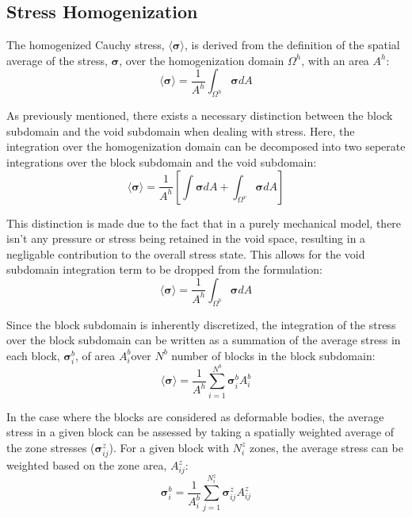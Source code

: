 \subsection{Stress Homogenization}

The homogenized Cauchy stress, $\langle\boldsymbol{\sigma}\rangle$,
is derived from the definition of the spatial average of the stress,
$\boldsymbol{\sigma}$, over the homogenization domain $\Omega^{h}$,
with an area $A^{h}$: 
\begin{equation}
\langle\boldsymbol{\sigma}\rangle=\frac{1}{A^{h}}\int_{\Omega^{h}}\boldsymbol{\sigma}dA\label{eqn:stress1}
\end{equation}


As previously mentioned, there exists a necessary distinction between
the block subdomain and the void subdomain when dealing with stress.
Here, the integration over the homogenization domain can be decomposed
into two seperate integrations over the block subdomain and the void
subdomain: 
\begin{equation}
\langle\boldsymbol{\sigma}\rangle=\frac{1}{A^{h}}\left[\int\boldsymbol{\sigma}dA+\int_{\Omega^{v}}\boldsymbol{\sigma}dA\right]\label{eqn:stress2}
\end{equation}


This distinction is made due to the fact that in a purely mechanical
model, there isn't any pressure or stress being retained in the void
space, resulting in a negligable contribution to the overall stress
state. This allows for the void subdomain integration term to be dropped
from the formulation: 
\begin{equation}
\langle\boldsymbol{\sigma}\rangle=\frac{1}{A^{h}}\int_{\Omega^{b}}\boldsymbol{\sigma}dA\label{eqn:stress2a}
\end{equation}


Since the block subdomain is inherently discretized, the integration
of the stress over the block subdomain can be written as a summation
of the average stress in each block, $\boldsymbol{\sigma}_{i}^{b}$,
of area $A_{i}^{b}$over $N^{b}$ number of blocks in the block subdomain:
\begin{equation}
\langle\boldsymbol{\sigma}\rangle=\frac{1}{A^{h}}\sum_{i=1}^{N^{b}}\boldsymbol{\sigma}_{i}^{b}A_{i}^{b}\label{eqn:stress3}
\end{equation}


In the case where the blocks are considered as deformable bodies,
the average stress in a given block can be assessed by taking a spatially
weighted average of the zone stresses ($\boldsymbol{\sigma}_{ij}^{z}$).
For a given block with $N_{i}^{z}$ zones, the average stress can
be weighted based on the zone area, $A_{ij}^{z}$: 
\begin{equation}
\boldsymbol{\sigma}_{i}^{b}=\frac{1}{A_{i}^{b}}\sum_{j=1}^{N_{i}^{z}}\boldsymbol{\sigma}_{ij}^{z}A_{ij}^{z}\label{eqn:stress3a}
\end{equation}


